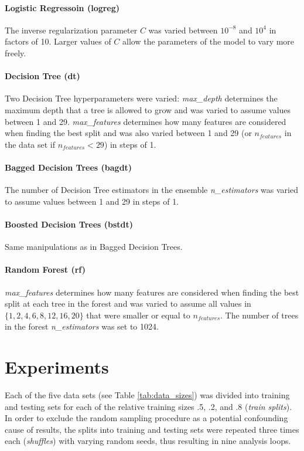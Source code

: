 \documentclass[twoside,11pt]{article}
\begin{document}
			\paragraph{Logistic Regressoin (logreg)}
			The inverse regularization parameter $C$ was varied between $10^{-8}$ and $10^4$ in factors of 10. Larger values of $C$ allow the parameters of the model to vary more freely.
			
			\paragraph{Decision Tree (dt)}
			Two Decision Tree hyperparameters were varied: \textit{max\_depth} determines the maximum depth that a tree is allowed to grow and was varied to assume values between 1 and 29. \textit{max\_features} determines how many features are considered when finding the best split and was also varied between 1 and 29 (or $n_{features}$ in the data set if $n_{features} < 29$) in steps of 1.
			
			\paragraph{Bagged Decision Trees (bagdt)}
			The number of Decision Tree estimators in the ensemble \textit{n\_estimators} was varied to assume values between 1 and 29 in steps of 1.
			
			\paragraph{Boosted Decision Trees (bstdt)}
			Same manipulations as in Bagged Decision Trees.
			
			\paragraph{Random Forest (rf)}
			\textit{max\_features} determines how many features are considered when finding the best split at each tree in the forest and was varied to assume all values in $\{1, 2, 4, 6, 8, 12, 16, 20\}$ that were smaller or equal to $n_{features}$. The number of trees in the forest \textit{n\_estimators} was set to 1024.
			
			
	
	\section{Experiments}
		
		Each of the five data sets (see Table \ref{tab:data_sizes}) was divided into training and testing sets for each of the relative training sizes .5, .2, and .8 (\textit{train splits}). In order to exclude the random sampling procedure as a potential confounding cause of results, the splits into training and testing sets were repeated three times each (\textit{shuffles}) with varying random seeds, thus resulting in nine analysis loops.
		
\end{document}
